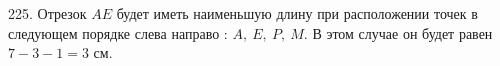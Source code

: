 225. Отрезок $AE$ будет иметь наименьшую длину при расположении точек в следующем порядке слева направо : $A,\ E,\ P,\ M.$ В этом случае он будет равен $7-3-1=3$ см.\\
